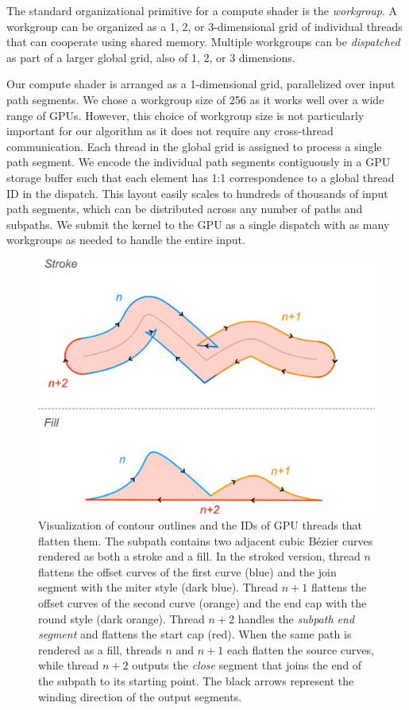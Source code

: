\documentclass[sigconf, authordraft]{acmart}
\begin{document}
The standard organizational primitive for a compute shader is the \emph{workgroup}. A workgroup can be organized as a 1, 2, or 3-dimensional grid of individual threads that can cooperate using shared memory. Multiple workgroups can be \emph{dispatched} as part of a larger global grid, also of 1, 2, or 3 dimensions.

Our compute shader is arranged as a 1-dimensional grid, parallelized over input path segments. We chose a workgroup size of 256 as it works well over a wide range of GPUs. However, this choice of workgroup size is not particularly important for our algorithm as it does not require any cross-thread communication. Each thread in the global grid is assigned to process a single path segment. We encode the individual path segments contiguously in a GPU storage buffer such that each element has 1:1 correspondence to a global thread ID in the dispatch. This layout easily scales to hundreds of thousands of input path segments, which can be distributed across any number of paths and subpaths. We submit the kernel to the GPU as a single dispatch with as many workgroups as needed to handle the entire input.

\begin{center}
\begin{figure}
    \includegraphics[scale=0.18]{stroke_threads}
    \caption{Visualization of contour outlines and the IDs of GPU threads that flatten them. The subpath contains two adjacent cubic Bézier curves rendered as both a stroke and a fill. In the stroked version, thread $n$ flattens the offset curves of the first curve (blue) and the join segment with the miter style (dark blue). Thread $n + 1$ flattens the offset curves of the second curve (orange) and the end cap with the round style (dark orange). Thread $n + 2$ handles the \emph{subpath end segment} and flattens the start cap (red). When the same path is rendered as a fill, threads $n$ and $n + 1$ each flatten the source curves, while thread $n + 2$ outputs the \emph{close} segment that joins the end of the subpath to its starting point. The black arrows represent the winding direction of the output segments.}
    \label{fig:stroke_threads}
\end{figure}
\end{center}
\end{document}
